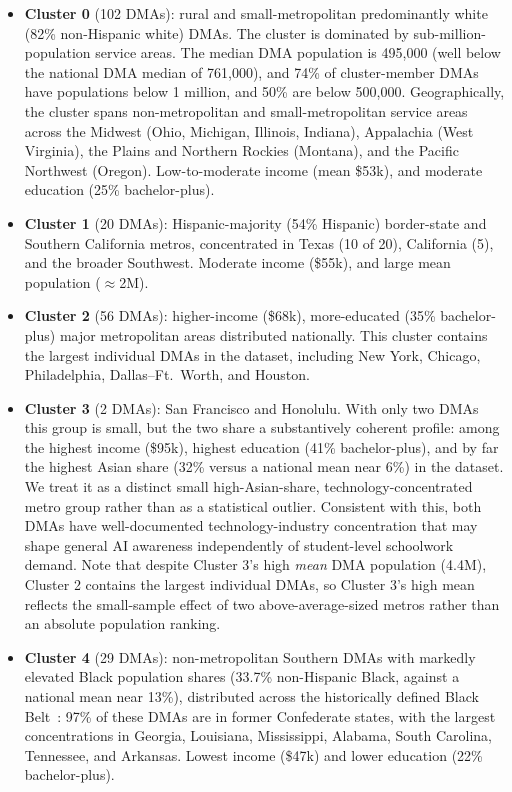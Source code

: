 \documentclass[11pt]{article}
\begin{document}
\begin{itemize}
    \item \textbf{Cluster 0} (102 DMAs): rural and small-metropolitan predominantly white (82\% non-Hispanic white) DMAs. The cluster is dominated by sub-million-population service areas. The median DMA population is 495{,}000 (well below the national DMA median of 761{,}000), and 74\% of cluster-member DMAs have populations below 1 million, and 50\% are below 500{,}000. Geographically, the cluster spans non-metropolitan and small-metropolitan service areas across the Midwest (Ohio, Michigan, Illinois, Indiana), Appalachia (West Virginia), the Plains and Northern Rockies (Montana), and the Pacific Northwest (Oregon). Low-to-moderate income (mean \$53k), and moderate education (25\% bachelor-plus).
    \item \textbf{Cluster 1} (20 DMAs): Hispanic-majority (54\% Hispanic) border-state and Southern California metros, concentrated in Texas (10 of 20), California (5), and the broader Southwest. Moderate income (\$55k), and large mean population ($\approx$2M).
    \item \textbf{Cluster 2} (56 DMAs): higher-income (\$68k), more-educated (35\% bachelor-plus) major metropolitan areas distributed nationally. This cluster contains the largest individual DMAs in the dataset, including New York, Chicago, Philadelphia, Dallas--Ft.\ Worth, and Houston.
    \item \textbf{Cluster 3} (2 DMAs): San Francisco and Honolulu. With only two DMAs this group is small, but the two share a substantively coherent profile: among the highest income (\$95k), highest education (41\% bachelor-plus), and by far the highest Asian share (32\% versus a national mean near 6\%) in the dataset. We treat it as a distinct small high-Asian-share, technology-concentrated metro group rather than as a statistical outlier. Consistent with this, both DMAs have well-documented technology-industry concentration that may shape general AI awareness independently of student-level schoolwork demand. Note that despite Cluster 3's high \emph{mean} DMA population (4.4M), Cluster 2 contains the largest individual DMAs, so Cluster 3's high mean reflects the small-sample effect of two above-average-sized metros rather than an absolute population ranking.
    \item \textbf{Cluster 4} (29 DMAs): non-metropolitan Southern DMAs with markedly elevated Black population shares (33.7\% non-Hispanic Black, against a national mean near 13\%), distributed across the historically defined Black Belt~\citep{wimberley2002}: 97\% of these DMAs are in former Confederate states, with the largest concentrations in Georgia, Louisiana, Mississippi, Alabama, South Carolina, Tennessee, and Arkansas. Lowest income (\$47k) and lower education (22\% bachelor-plus).
\end{itemize}
\end{document}
